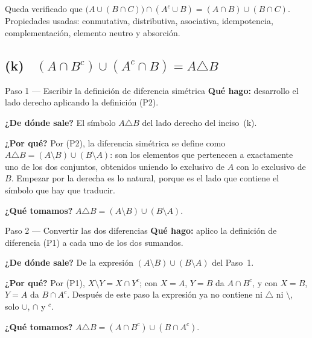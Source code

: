 \documentclass[11pt]{article}
\begin{document}
\begin{resp}
Queda verificado que $\bigl(A\cup(B\cap C)\bigr)\cap(A^{c}\cup B)=(A\cap B)\cup(B\cap C)$.
Propiedades usadas: conmutativa, distributiva, asociativa, idempotencia, complementación,
elemento neutro y absorción.
\end{resp}

\subsection*{(k) \ $(A\cap B^{c})\cup(A^{c}\cap B)=A\triangle B$}

\begin{paso}{Paso 1 --- Escribir la definición de diferencia simétrica}
\textbf{Qué hago:} desarrollo el lado derecho aplicando la definición (P2).

\textbf{¿De dónde sale?} El símbolo $A\triangle B$ del lado derecho del inciso~(k).

\textbf{¿Por qué?} Por (P2), la diferencia simétrica se define como
$A\triangle B=(A\setminus B)\cup(B\setminus A)$: son los elementos que pertenecen a exactamente
uno de los dos conjuntos, obtenidos uniendo lo exclusivo de $A$ con lo exclusivo de $B$. Empezar
por la derecha es lo natural, porque es el lado que contiene el símbolo que hay que traducir.

\textbf{¿Qué tomamos?} $A\triangle B=(A\setminus B)\cup(B\setminus A)$.
\end{paso}

\begin{paso}{Paso 2 --- Convertir las dos diferencias}
\textbf{Qué hago:} aplico la definición de diferencia (P1) a cada uno de los dos sumandos.

\textbf{¿De dónde sale?} De la expresión $(A\setminus B)\cup(B\setminus A)$ del Paso~1.

\textbf{¿Por qué?} Por (P1), $X\setminus Y=X\cap Y^{c}$; con $X=A$, $Y=B$ da $A\cap B^{c}$, y con
$X=B$, $Y=A$ da $B\cap A^{c}$. Después de este paso la expresión ya no contiene ni $\triangle$
ni $\setminus$, solo $\cup$, $\cap$ y $^{c}$.

\textbf{¿Qué tomamos?} $A\triangle B=(A\cap B^{c})\cup(B\cap A^{c})$.
\end{paso}
\end{document}
